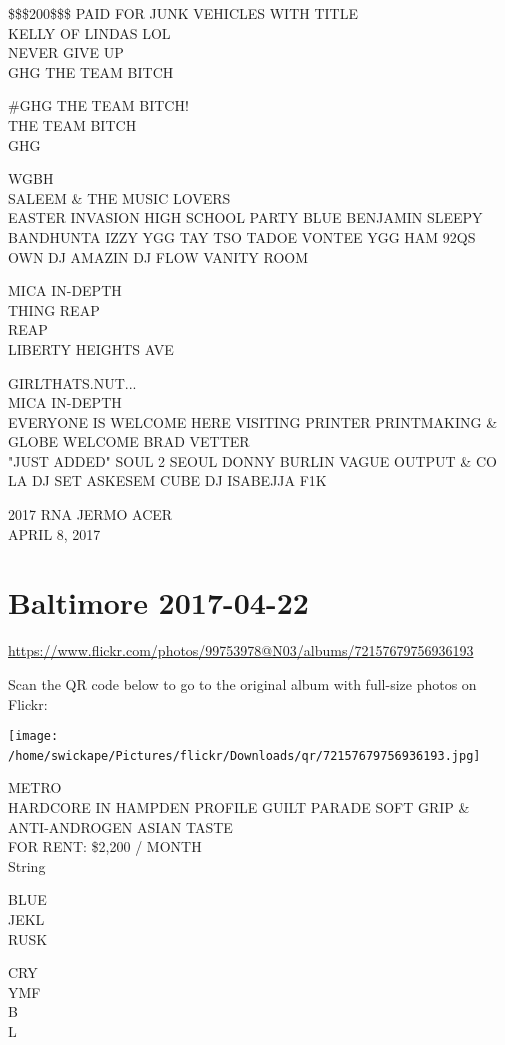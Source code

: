 \documentclass[10pt,letterpaper]{article}
\begin{document}
\$\$\$200\$\$\$ PAID FOR JUNK VEHICLES WITH TITLE\\
KELLY OF LINDAS LOL\\
NEVER GIVE UP\\
GHG THE TEAM BITCH

\#GHG THE TEAM BITCH!\\
THE TEAM BITCH\\
GHG

WGBH\\
SALEEM \& THE MUSIC LOVERS\\
EASTER INVASION HIGH SCHOOL PARTY BLUE BENJAMIN SLEEPY BANDHUNTA IZZY YGG TAY TSO TADOE VONTEE YGG HAM 92QS OWN DJ AMAZIN DJ FLOW VANITY ROOM

MICA IN{-}DEPTH\\
THING REAP\\
REAP\\
LIBERTY HEIGHTS AVE

GIRLTHATS.NUT...\\
MICA IN{-}DEPTH\\
EVERYONE IS WELCOME HERE VISITING PRINTER PRINTMAKING \& GLOBE WELCOME BRAD VETTER\\
"JUST ADDED" SOUL 2 SEOUL DONNY BURLIN VAGUE OUTPUT \& CO LA DJ SET ASKESEM CUBE DJ ISABEJJA F1K

2017 RNA JERMO ACER\\
APRIL 8, 2017
\

\section*{Baltimore 2017-04-22}

\url{https://www.flickr.com/photos/99753978@N03/albums/72157679756936193}

Scan the QR code below to go to the original album with full-size photos on Flickr:

\texttt{[image: /home/swickape/Pictures/flickr/Downloads/qr/72157679756936193.jpg]}
\

METRO\\
HARDCORE IN HAMPDEN PROFILE GUILT PARADE SOFT GRIP \& ANTI{-}ANDROGEN ASIAN TASTE\\
FOR RENT: \$2,200 / MONTH\\
String

BLUE\\
JEKL\\
RUSK

CRY\\
YMF\\
B\\
L
\end{document}
